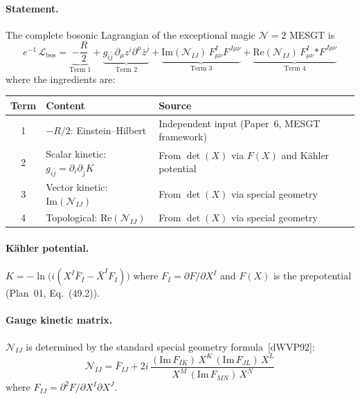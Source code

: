 \paragraph{Statement.}
The complete bosonic Lagrangian of the exceptional magic
$\mathcal{N}=2$ MESGT is
\begin{equation}\tag{49.6}
  e^{-1}\, \mathcal{L}_{\mathrm{bos}} =
    \underbrace{-\frac{R}{2}}_{\text{Term 1}}
    + \underbrace{g_{i\bar{j}}\, \partial_\mu z^i \partial^\mu \bar{z}^{\bar{j}}}_{\text{Term 2}}
    + \underbrace{\mathrm{Im}(\mathcal{N}_{IJ})\, F^I_{\mu\nu} F^{J\mu\nu}}_{\text{Term 3}}
    + \underbrace{\mathrm{Re}(\mathcal{N}_{IJ})\, F^I_{\mu\nu} {*F}^{J\mu\nu}}_{\text{Term 4}}
\end{equation}
where the ingredients are:

\begin{center}
\begin{tabular}{c|l|l}
\hline
\textbf{Term} & \textbf{Content} & \textbf{Source} \\
\hline
1 & $-R/2$: Einstein--Hilbert &
  Independent input (Paper~6, MESGT framework) \\
\hline
2 & Scalar kinetic: $g_{i\bar{j}} = \partial_i \partial_{\bar{j}} K$ &
  From $\det(X)$ via $F(X)$ and K\"ahler potential \\
\hline
3 & Vector kinetic: $\mathrm{Im}(\mathcal{N}_{IJ})$ &
  From $\det(X)$ via special geometry \\
\hline
4 & Topological: $\mathrm{Re}(\mathcal{N}_{IJ})$ &
  From $\det(X)$ via special geometry \\
\hline
\end{tabular}
\end{center}

\paragraph{K\"ahler potential.}
$K = -\ln\!\bigl(i(X^I \bar{F}_I - \bar{X}^I F_I)\bigr)$
where $F_I = \partial F / \partial X^I$ and $F(X)$ is the
prepotential (Plan~01, Eq.~(49.2)).

\paragraph{Gauge kinetic matrix.}
$\mathcal{N}_{IJ}$ is determined by the standard special geometry
formula~[dWVP92]:
\[
  \mathcal{N}_{IJ} = \bar{F}_{IJ}
    + 2i\,\frac{(\mathrm{Im}\, F_{IK})\, X^K\,
                 (\mathrm{Im}\, F_{JL})\, X^L}
                 {X^M\, (\mathrm{Im}\, F_{MN})\, X^N}
\]
where $F_{IJ} = \partial^2 F / \partial X^I \partial X^J$.

